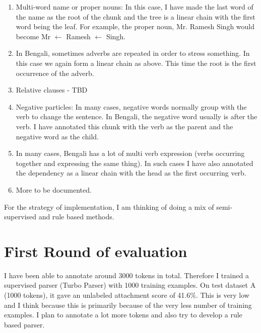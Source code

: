 \documentclass[11pt,letterpaper]{article}
\begin{document}
\begin{enumerate}
\item Multi-word name or proper nouns: In this case, I have made the last word of the name as the root of the chunk and the tree is a linear chain with the first word being the leaf. For example, the proper noun, Mr. Ramesh Singh would become Mr $\leftarrow$ Ramesh $\leftarrow$ Singh.
\item In Bengali, sometimes adverbs are repeated in order to stress something. In this case we again form a linear chain as above. This time the root is the first occurrence of the adverb.
\item Relative clauses - TBD
\item Negative particles: In many cases, negative words normally group with the verb to change the sentence. In Bengali, the negative word usually is after the verb. I have annotated this chunk with the verb as the parent and the negative word as the child.
\item In many cases, Bengali has a lot of multi verb expression (verbs occurring together and expressing the same thing). In such cases I have also annotated the dependency as a linear chain with the head as the first occurring verb.
\item More to be documented.
\end{enumerate}

For the strategy of implementation, I am thinking of doing a  mix of semi-supervised and rule based methods.

\section{First Round of evaluation}
I have been able to annotate around 3000 tokens in total. Therefore I trained a supervised parser (Turbo Parser) with 1000 training examples. On test dataset A (1000 tokens), it gave an unlabeled attachment score of 41.6$\%$. This is very low and I think because this is primarily because of the very less number of training examples. I plan to annotate a lot more tokens and also try to develop a rule based parser.
 

\newpage




\label{lastpage}
\end{document}
